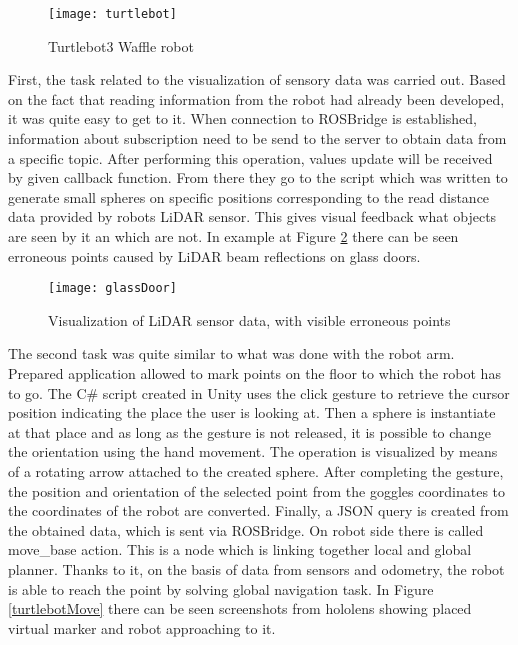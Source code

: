 \documentclass[printmode,en]{mgr}
\begin{document}
\begin{figure}[!ht]
  \centering
    \texttt{[image: turtlebot]}
  \caption{Turtlebot3 Waffle robot}
  \label{fig:turtlebot}
\end{figure}

First, the task related to the visualization of sensory data was carried out. Based on the fact that reading information from the robot had already been developed, it was quite easy to get to it. When connection to ROSBridge is established, information about subscription need to be send to the server to obtain data from a specific topic. After performing this operation, values update will be received by given callback function. From there they go to the script which was written to generate small spheres on specific positions corresponding to the read distance data provided by robots LiDAR sensor. This gives visual feedback what objects are seen by it an which are not. In example at Figure \ref{fig:glassDoor} there can be seen erroneous points caused by LiDAR beam reflections on glass doors.

\begin{figure}[!ht]
  \centering
    \texttt{[image: glassDoor]}
  \caption{Visualization of LiDAR sensor data, with visible erroneous points}
  \label{fig:glassDoor}
\end{figure}

The second task was quite similar to what was done with the robot arm. Prepared application allowed to mark points on the floor to which the robot has to go. The C\# script created in Unity uses the click gesture to retrieve the cursor position indicating the place the user is looking at. Then a sphere is instantiate at that place and as long as the gesture is not released, it is possible to change the orientation using the hand movement. The operation is visualized by means of a rotating arrow attached to the created sphere. After completing the gesture, the position and orientation of the selected point from the goggles coordinates to the coordinates of the robot are converted. Finally, a JSON query is created from the obtained data, which is sent via ROSBridge. On robot side there is called move\_base action. This is a node which is linking together local and global planner. Thanks to it, on the basis of data from sensors and odometry, the robot is able to reach the point by solving global navigation task. In Figure \ref{turtlebotMove} there can be seen screenshots from hololens showing placed virtual marker and robot approaching to it.
\end{document}
